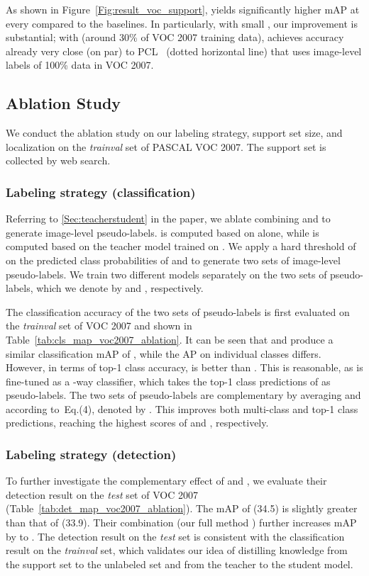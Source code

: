 \documentclass[review]{elsarticle}
\begin{document}
{As shown in Figure~\ref{Fig:result_voc_support}, \ours yields significantly higher mAP at every  compared to the baselines. In particularly, with small , our improvement is substantial; with  (around 30\% of VOC 2007 training data), \ours achieves accuracy already very close (on par) to PCL~\cite{tang2018pami} (dotted horizontal line) that uses image-level labels of 100\% data in VOC 2007.}


\subsection{Ablation Study}
\label{sec:ablation}

We conduct the ablation study
on our labeling strategy, support set size, and localization on the \emph{trainval} set of PASCAL VOC 2007. The support set  is collected by web search. 

\subsubsection{Labeling strategy (classification)}
Referring to \autoref{Sec:teacherstudent} in the paper, we ablate combining  and  to generate image-level pseudo-labels.  is computed based on  alone, while  is computed based on the teacher model trained on . We apply a hard threshold of  on the predicted class probabilities of  and  to generate two sets of image-level pseudo-labels. We train two different models separately on the two sets of pseudo-labels, which we denote by \oursg and \oursx, respectively.

The classification accuracy of the two sets of pseudo-labels is first evaluated on the \emph{trainval} set of VOC 2007 and shown in Table~\ref{tab:cls_map_voc2007_ablation}. It can be seen that \oursg and \oursx produce a similar classification mAP of  \vs , while the AP on individual classes differs. However, in terms of top-1 class accuracy, \oursx is better than \oursg. This is reasonable, as \oursx is fine-tuned as a -way classifier, which takes the top-1 class predictions of  as pseudo-labels. The two sets of pseudo-labels are complementary by averaging  and  according to~Eq.(4), denoted by \ours. This improves both multi-class and top-1 class predictions, reaching the highest scores of  and , respectively.

\subsubsection{Labeling strategy (detection)} 
To further investigate the complementary effect of \oursg and \oursx, we evaluate their detection result on the \emph{test} set of VOC 2007 (Table~\ref{tab:det_map_voc2007_ablation}). The mAP of \oursx (34.5) is slightly greater than that of \oursg (33.9). Their combination (our full method \ours) further increases mAP by  to .
The detection result on the \emph{test} set is consistent with the classification result on the \emph{trainval} set, which validates our idea of distilling knowledge from the support set to the unlabeled set and from the teacher to the student model.
\end{document}
